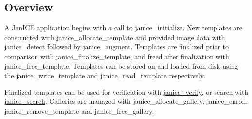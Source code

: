 \hypertarget{group__janice_Overview}{}\subsection{Overview}\label{group__janice_Overview}
A Jan\+I\+C\+E application begins with a call to \hyperlink{group__janice_gaaf573a6dd7b46fccb2cbc61fb45f34ff}{janice\+\_\+initialize}. New templates are constructed with janice\+\_\+allocate\+\_\+template and provided image data with \hyperlink{group__janice_gafa4e88d39c9279d985b2e8f8d21e17dc}{janice\+\_\+detect} followed by janice\+\_\+augment. Templates are finalized prior to comparison with janice\+\_\+finalize\+\_\+template, and freed after finalization with janice\+\_\+free\+\_\+template. Templates can be stored on and loaded from disk using the janice\+\_\+write\+\_\+template and janice\+\_\+read\+\_\+template respectively.

Finalized templates can be used for verification with \hyperlink{group__janice_gaee2b54d08a42051eb1d3e29fa5f87758}{janice\+\_\+verify}, or search with \hyperlink{group__janice_gacf0576e4ddcad691ff955fc3eee1e2eb}{janice\+\_\+search}. Galleries are managed with janice\+\_\+allocate\+\_\+gallery, janice\+\_\+enroll, janice\+\_\+remove\+\_\+template and janice\+\_\+free\+\_\+gallery.

